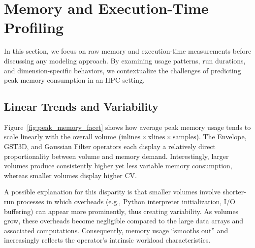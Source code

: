 \section{Memory and Execution-Time Profiling}
\label{sec:pmc-results-memory-and-execution-time-profiling}

In this section, we focus on raw memory and execution-time measurements before discussing any modeling approach.
By examining usage patterns, run durations, and dimension-specific behaviors, we contextualize the challenges of predicting peak memory consumption in an \ac{HPC} setting.

\subsection{Linear Trends and Variability}
\label{subsec:linear-trends-and-variability}

Figure~\ref{fig:peak_memory_facet} shows how average peak memory usage tends to scale linearly with the overall volume (\(\text{inlines} \times \text{xlines} \times \text{samples}\)). 
The Envelope, \ac{GST3D}, and Gaussian Filter operators each display a relatively direct proportionality between volume and memory demand.
Interestingly, larger volumes produce consistently higher yet less variable memory consumption, whereas smaller volumes display higher \ac{CV}.

A possible explanation for this disparity is that smaller volumes involve shorter-run processes in which overheads (e.g., Python interpreter initialization, I/O buffering) can appear more prominently, thus creating variability.
As volumes grow, these overheads become negligible compared to the large data arrays and associated computations.
Consequently, memory usage “smooths out” and increasingly reflects the operator’s intrinsic workload characteristics.

